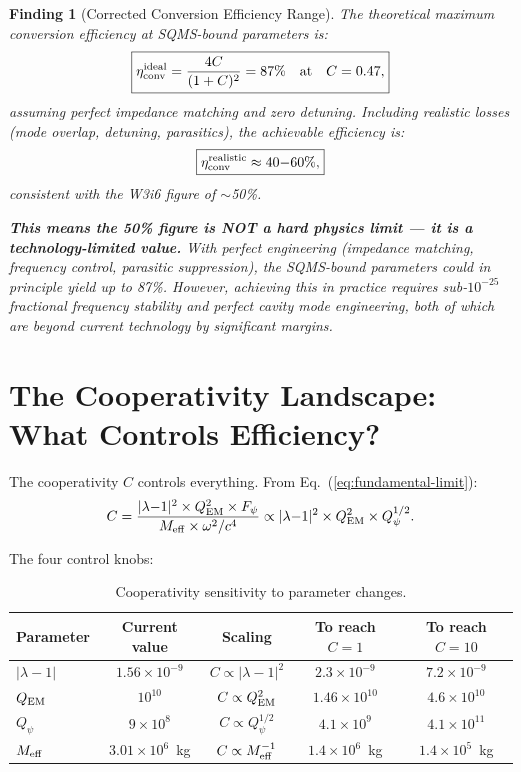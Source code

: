 \documentclass[11pt]{article}
\newtheorem{finding}{Finding}
\newcommand{\ee}[1]{\times 10^{#1}}
\newcommand{\Meff}{M_{\rm eff}}
\newcommand{\lambdaone}{|\lambda{-}1|}
\newcommand{\Qpsi}{Q_\psi}
\newcommand{\QEM}{Q_{\rm EM}}
\newcommand{\Fpsi}{F_\psi}
\begin{document}
\begin{finding}[Corrected Conversion Efficiency Range]
\label{find:corrected-eta}
The theoretical maximum conversion efficiency at SQMS-bound parameters
is:
\begin{equation}
\boxed{
\eta_{\rm conv}^{\rm ideal} = \frac{4C}{(1+C)^2}
= 87\% \quad\text{at}\quad C = 0.47,
}
\label{eq:eta-ideal}
\end{equation}
assuming perfect impedance matching and zero detuning. Including
realistic losses (mode overlap, detuning, parasitics), the
achievable efficiency is:
\begin{equation}
\boxed{
\eta_{\rm conv}^{\rm realistic} \approx 40{-}60\%,
}
\end{equation}
consistent with the W3i6 figure of $\sim$50\%.

\textbf{This means the 50\% figure is NOT a hard physics limit --- it
is a technology-limited value.} With perfect engineering (impedance
matching, frequency control, parasitic suppression), the SQMS-bound
parameters could in principle yield up to 87\%. However, achieving this
in practice requires sub-$10^{-25}$ fractional frequency stability and
perfect cavity mode engineering, both of which are beyond current
technology by significant margins.
\end{finding}

\section{The Cooperativity Landscape: What Controls Efficiency?}
\label{sec:cooperativity-landscape}

The cooperativity $C$ controls everything. From
Eq.~(\ref{eq:fundamental-limit}):
\begin{equation}
C = \frac{\lambdaone^2 \times \QEM^2 \times \Fpsi}{\Meff \times
\omega^2/c^4} \propto \lambdaone^2 \times \QEM^2 \times \Qpsi^{1/2}.
\label{eq:C-scaling}
\end{equation}

The four control knobs:

\begin{table}[H]
\centering
\caption{Cooperativity sensitivity to parameter changes.}
\label{tab:C-sensitivity}
\begin{tabular}{@{}lcccc@{}}
\toprule
Parameter & Current value & Scaling & To reach $C=1$ & To reach $C=10$ \\
\midrule
$\lambdaone$ & $1.56\ee{-9}$ & $C \propto \lambdaone^2$
  & $2.3\ee{-9}$ & $7.2\ee{-9}$ \\
$\QEM$ & $10^{10}$ & $C \propto \QEM^2$
  & $1.46\ee{10}$ & $4.6\ee{10}$ \\
$\Qpsi$ & $9\ee{8}$ & $C \propto \Qpsi^{1/2}$
  & $4.1\ee{9}$ & $4.1\ee{11}$ \\
$\Meff$ & $3.01\ee{6}$~kg & $C \propto \Meff^{-1}$
  & $1.4\ee{6}$~kg & $1.4\ee{5}$~kg \\
\bottomrule
\end{tabular}
\end{table}
\end{document}
